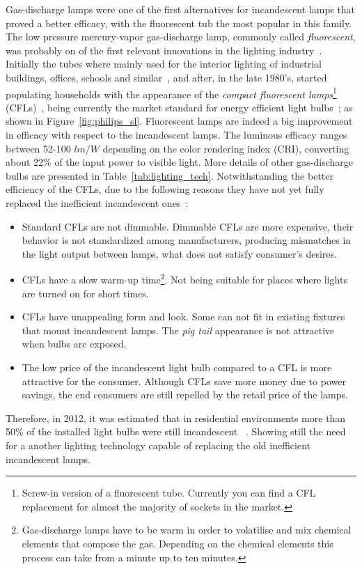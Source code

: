 Gas-discharge lamps were one of the first alternatives for incandescent lamps that proved a better efficacy, with the fluorescent tub the most popular in this family. The low pressure mercury-vapor gas-discharge  lamp, commonly called \emph{fluorescent}, was probably on of the first relevant innovations in the lighting industry~\cite{39inman}. Initially the tubes where mainly used for the interior lighting of industrial buildings, offices, schools and similar~\cite{39oDay,82bouwknegt}, and after, in the late 1980's, started populating households with the appearance of the \emph{compact fluorescent lamps}\footnote{Screw-in version of a fluorescent tube. Currently you can find a CFL replacement for almost the majority of sockets in the market.} (CFLs)~\cite{82bouwknegt}, being currently the market standard for energy efficient light bulbs~\cite{11EPA}; as shown in Figure~\ref{fig:philips_sl}. Fluorescent lamps are indeed a big improvement in efficacy with respect to the incandescent lamps. The luminous efficacy ranges between 52-100 $lm/W$ depending on the color rendering index (CRI), converting about 22\% of the input power to visible light. More details of other gas-discharge bulbs are presented in Table~\ref{tab:lighting_tech}. Notwithstanding the better efficiency of the CFLs, due to the following reasons they have not yet fully replaced the inefficient incandescent ones~\cite{11EPA}:

\begin{itemize}
  \item Standard CFLs are not dimmable.  Dimmable CFLs are more expensive, their behavior is not standardized among manufacturers, producing mismatches in the light output between lamps, what does not satisfy consumer's desires.

  \item CFLs have a slow warm-up time\footnote{Gas-discharge lamps have to be warm in order to volatilise and mix chemical elements that compose the gas. Depending on the chemical elements this process can take from a minute up to ten minutes. }. Not being suitable for places where lights are turned on for short times.

  \item CFLs have unappealing form and look. Some can not fit in existing fixtures that mount incandescent lamps. The \emph{pig tail} appearance is not attractive when bulbs are exposed.

  \item The low price of the incandescent light bulb compared to a CFL is more attractive for the consumer. Although CFLs save more money due to power savings, the end consumers are still repelled by the retail price of the lamps.

\end{itemize}
Therefore, in 2012, it was estimated that in residential environments more than 50\% of the installed light bulbs were still incandescent ~\cite{13ALED}. Showing still the need for a another lighting technology capable of replacing the old inefficient incandescent lamps.

